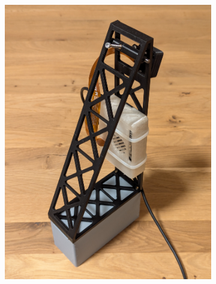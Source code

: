\begin{figure}[H]
\centering
\begin{subfigure}{0.4\textwidth}
\centering
\includegraphics[width=0.95\linewidth]{assets/informatik-prototyp/camer_tower_1.png} 
\end{subfigure}
\begin{subfigure}{0.4\textwidth}
\centering

\end{subfigure}
\end{figure}
